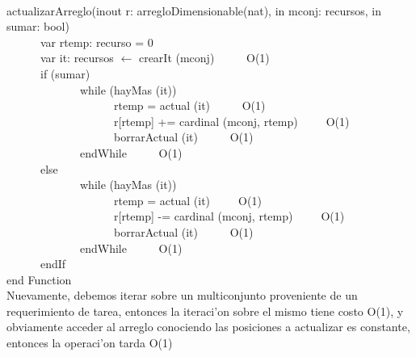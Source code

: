 \documentclass[a4paper,10pt]{article}
\begin{document}
\newpage

\begin{algoritmo}
\caption{}\\
  actualizarArreglo(inout r: arregloDimensionable(nat), in mconj: recursos, in sumar: bool) \\
	\indent \ \ \ \ \ \  var rtemp: recurso = 0 \ \ \ \ \ \\
	\indent \ \ \ \ \ \  var it: recursos $\gets$ crearIt (mconj)  \ \ \ \ \ O(1)\\ 
	\indent \ \ \ \ \ \  if (sumar) \ \ \ \ \ \\
	\indent \ \ \ \ \ \ \ \ \ \ \ \ \ while (hayMas (it))  \ \ \ \ \ \\
	\indent \ \ \ \ \ \ \ \ \ \ \ \ \ \ \ \ \ \ \ rtemp = actual (it) \ \ \ \ \ O(1) \\
	\indent \ \ \ \ \ \ \ \ \ \ \ \ \ \ \ \ \ \ \ r[rtemp] += cardinal (mconj, rtemp)\ \ \ \ \ O(1) \\
	\indent \ \ \ \ \ \ \ \ \ \ \ \ \ \ \ \ \ \ \ borrarActual (it) \ \ \ \ \ O(1) \\
	\indent \ \ \ \ \ \ \ \ \ \ \ \ \ endWhile \ \ \ \ \ O(1)\\
	\indent \ \ \ \ \ \ else \ \ \ \ \ \\
	\indent \ \ \ \ \ \ \ \ \ \ \ \ \ while (hayMas (it))  \ \ \ \ \ \\
	\indent \ \ \ \ \ \ \ \ \ \ \ \ \ \ \ \ \ \ \ rtemp = actual (it)\ \ \ \ \ O(1) \\
	\indent \ \ \ \ \ \ \ \ \ \ \ \ \ \ \ \ \ \ \ r[rtemp] -= cardinal (mconj, rtemp)\ \ \ \ \ O(1) \\
	\indent \ \ \ \ \ \ \ \ \ \ \ \ \ \ \ \ \ \ \ borrarActual (it) \ \ \ \ \ O(1) \\
	\indent \ \ \ \ \ \ \ \ \ \ \ \ \ endWhile \ \ \ \ \ O(1)\\
	\indent \ \ \ \ \ \ endIf \ \ \ \ \ \\
   end Function\\

Nuevamente, debemos iterar sobre un multiconjunto proveniente de un requerimiento de tarea, entonces la iteraci'on sobre el mismo tiene costo O(1), y obviamente acceder al arreglo conociendo las posiciones a actualizar es constante, entonces la operaci'on tarda O(1) 
\end{algoritmo}
\end{document}
